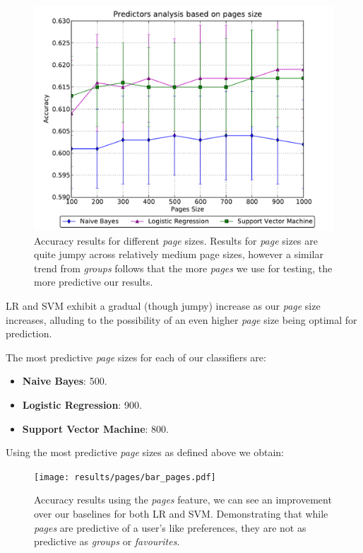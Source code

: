 \begin{figure}[h]
	\begin{center}
		\includegraphics[scale=0.75]{results/pages/top_pages.pdf}
		\caption{Accuracy results for different \emph{page} sizes. Results for \emph{page} sizes are quite jumpy across relatively medium page sizes, however a similar trend 
				 from \emph{groups} follows that the more \emph{pages} we use for testing, the more predictive our results.}
	\end{center}
\end{figure}

LR and SVM exhibit a gradual (though jumpy) increase as our \emph{page} size increases, alluding to the possibility of an even higher \emph{page}
size being optimal for prediction.

The most predictive \emph{page} sizes for each of our classifiers are:
\begin{itemize}
\item \textbf{Naive Bayes}: 500.
\item \textbf{Logistic Regression}: 900.
\item \textbf{Support Vector Machine}: 800.
\end{itemize}

\clearpage

Using the most predictive \emph{page} sizes as defined above we obtain:

\begin{figure}[h]
	\begin{center}
		\texttt{[image: results/pages/bar\_pages.pdf]}
		\caption{Accuracy results using the \emph{pages} feature, we can see an improvement over our baselines for both LR and SVM. 
				 Demonstrating that while \emph{pages} are predictive of a user's like preferences, they are not as predictive as 
				 \emph{groups} or \emph{favourites}.}
	\end{center}
\end{figure}

